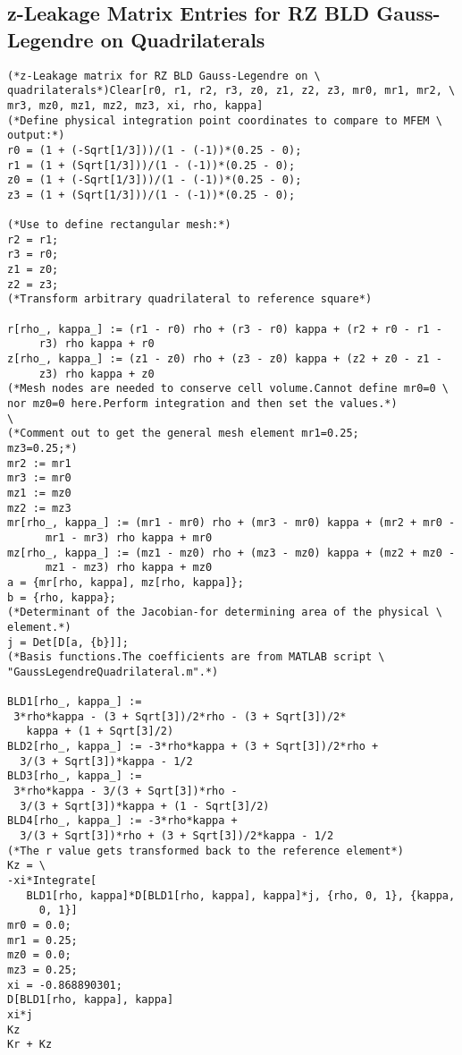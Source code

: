 \documentclass{article}
\begin{document}
\subsection{z-Leakage Matrix Entries for RZ BLD Gauss-Legendre on Quadrilaterals}

\begin{verbatim}
(*z-Leakage matrix for RZ BLD Gauss-Legendre on \
quadrilaterals*)Clear[r0, r1, r2, r3, z0, z1, z2, z3, mr0, mr1, mr2, \
mr3, mz0, mz1, mz2, mz3, xi, rho, kappa]
(*Define physical integration point coordinates to compare to MFEM \
output:*)
r0 = (1 + (-Sqrt[1/3]))/(1 - (-1))*(0.25 - 0);
r1 = (1 + (Sqrt[1/3]))/(1 - (-1))*(0.25 - 0);
z0 = (1 + (-Sqrt[1/3]))/(1 - (-1))*(0.25 - 0);
z3 = (1 + (Sqrt[1/3]))/(1 - (-1))*(0.25 - 0);

(*Use to define rectangular mesh:*)
r2 = r1;
r3 = r0;
z1 = z0;
z2 = z3;
(*Transform arbitrary quadrilateral to reference square*)

r[rho_, kappa_] := (r1 - r0) rho + (r3 - r0) kappa + (r2 + r0 - r1 - 
     r3) rho kappa + r0
z[rho_, kappa_] := (z1 - z0) rho + (z3 - z0) kappa + (z2 + z0 - z1 - 
     z3) rho kappa + z0
(*Mesh nodes are needed to conserve cell volume.Cannot define mr0=0 \
nor mz0=0 here.Perform integration and then set the values.*)
\
(*Comment out to get the general mesh element mr1=0.25;
mz3=0.25;*)
mr2 := mr1
mr3 := mr0
mz1 := mz0
mz2 := mz3
mr[rho_, kappa_] := (mr1 - mr0) rho + (mr3 - mr0) kappa + (mr2 + mr0 -
      mr1 - mr3) rho kappa + mr0
mz[rho_, kappa_] := (mz1 - mz0) rho + (mz3 - mz0) kappa + (mz2 + mz0 -
      mz1 - mz3) rho kappa + mz0
a = {mr[rho, kappa], mz[rho, kappa]};
b = {rho, kappa};
(*Determinant of the Jacobian-for determining area of the physical \
element.*)
j = Det[D[a, {b}]];
(*Basis functions.The coefficients are from MATLAB script \
"GaussLegendreQuadrilateral.m".*)

BLD1[rho_, kappa_] := 
 3*rho*kappa - (3 + Sqrt[3])/2*rho - (3 + Sqrt[3])/2*
   kappa + (1 + Sqrt[3]/2)
BLD2[rho_, kappa_] := -3*rho*kappa + (3 + Sqrt[3])/2*rho + 
  3/(3 + Sqrt[3])*kappa - 1/2
BLD3[rho_, kappa_] := 
 3*rho*kappa - 3/(3 + Sqrt[3])*rho - 
  3/(3 + Sqrt[3])*kappa + (1 - Sqrt[3]/2)
BLD4[rho_, kappa_] := -3*rho*kappa + 
  3/(3 + Sqrt[3])*rho + (3 + Sqrt[3])/2*kappa - 1/2
(*The r value gets transformed back to the reference element*)
Kz = \
-xi*Integrate[
   BLD1[rho, kappa]*D[BLD1[rho, kappa], kappa]*j, {rho, 0, 1}, {kappa,
     0, 1}]
mr0 = 0.0;
mr1 = 0.25;
mz0 = 0.0;
mz3 = 0.25;
xi = -0.868890301;
D[BLD1[rho, kappa], kappa]
xi*j
Kz
Kr + Kz
\end{verbatim}
\end{document}
